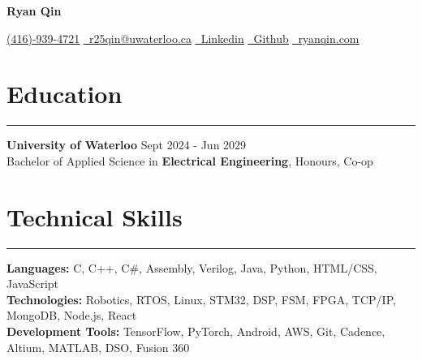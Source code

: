 \documentclass[10pt]{article}
\newcommand{\secsep}{0.5em}
\newcommand{\SSsep}{-2.0em}
\newcommand{\LtLsep}{0.5em}
\newcommand{\MHtLsep}{-0.7em}
\newcommand{\LtHsep}{0.9em}
\newcommand{\tabOffSet}{1.0em}
\begin{document}
 

\begin{center} 
    {\LARGE \textbf{Ryan Qin}} \\[0.7em]

    \newcommand{\linksep}{0.2em}

    \href{tel:+14169394721}{\uline{\faPhone (416)-939-4721}}
    \hspace{\linksep}\textbar\hspace{\linksep}
    \href{r25qin@uwaterloo.ca}{\uline{\faEnvelope \ r25qin@uwaterloo.ca}}
    \hspace{\linksep}\textbar\hspace{\linksep}
    \href{https://www.linkedin.com/in/ryan-qin-ece/}{\uline{\faLinkedin \ Linkedin}}
    \hspace{\linksep}\textbar\hspace{\linksep}
    \href{https://linkedin.com/in/yourusername}{\uline{\faGithub \ Github}}
    \hspace{\linksep}\textbar\hspace{\linksep}
    \href{https://www.ryanqin.com/}{\uline{\faLink \ ryanqin.com}}
    \\[\secsep]
\end{center} 

\section*{\large {Education}} \vspace{\MHtLsep} \hrule 
\vspace{\LtHsep}
\textbf{University of Waterloo} \hfill Sept 2024 - Jun 2029 \\[\LtLsep]
Bachelor of Applied Science in \textbf{Electrical Engineering}, Honours, Co-op
\\[\SSsep]

\section*{\large {Technical Skills}} \vspace{\MHtLsep} \hrule 
\vspace{\LtHsep}
\hspace*{\tabOffSet}\textbf{Languages:} C, C++, C\#, Assembly, Verilog, Java, Python, HTML/CSS, JavaScript \\[\LtLsep]
\hspace*{\tabOffSet}\textbf{Technologies:}  Robotics, RTOS, Linux, STM32, DSP, FSM, FPGA, TCP/IP, MongoDB, Node.js, React  \\[\LtLsep]
\hspace*{\tabOffSet}\textbf{Development Tools:} TensorFlow, PyTorch, Android, AWS, Git, Cadence, Altium, MATLAB, DSO, Fusion 360
\\[\SSsep]
\end{document}
